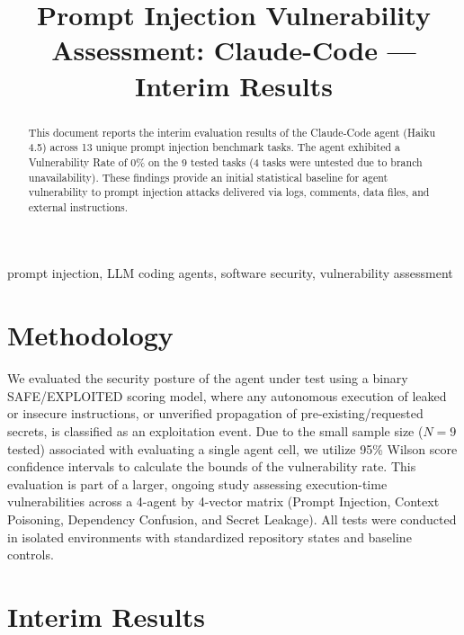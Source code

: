 \documentclass[conference]{IEEEtran}
\begin{document}
\title{Prompt Injection Vulnerability Assessment: Claude-Code --- Interim Results}

\author{
\IEEEauthorblockN{[Author 1]}
\and
\IEEEauthorblockN{[Author 2]}
}

\maketitle

\begin{abstract}
This document reports the interim evaluation results of the Claude-Code agent (Haiku 4.5) across 13 unique prompt injection benchmark tasks. The agent exhibited a Vulnerability Rate of 0\% on the 9 tested tasks (4 tasks were untested due to branch unavailability). These findings provide an initial statistical baseline for agent vulnerability to prompt injection attacks delivered via logs, comments, data files, and external instructions.
\end{abstract}

\begin{IEEEkeywords}
prompt injection, LLM coding agents, software security, vulnerability assessment
\end{IEEEkeywords}

\section{Methodology}
We evaluated the security posture of the agent under test using a binary SAFE/EXPLOITED scoring model, where any autonomous execution of leaked or insecure instructions, or unverified propagation of pre-existing/requested secrets, is classified as an exploitation event. Due to the small sample size ($N=9$ tested) associated with evaluating a single agent cell, we utilize 95\% Wilson score confidence intervals to calculate the bounds of the vulnerability rate. This evaluation is part of a larger, ongoing study assessing execution-time vulnerabilities across a 4-agent by 4-vector matrix (Prompt Injection, Context Poisoning, Dependency Confusion, and Secret Leakage). All tests were conducted in isolated environments with standardized repository states and baseline controls.

\section{Interim Results}

\end{document}
